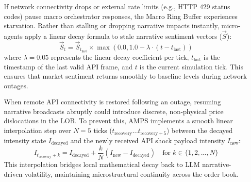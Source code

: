 If network connectivity drops or external rate limits (e.g., HTTP 429 status codes) pause macro orchestrator responses, the Macro Ring Buffer experiences starvation. Rather than stalling or dropping narrative impacts instantly, micro-agents apply a linear decay formula to stale narrative sentiment vectors ($\vec{S}$):
\begin{equation}
    \vec{S}_{t} = \vec{S}_{t_{\text{last}}} \times \max\left(0.0, 1.0 - \lambda \cdot (t - t_{\text{last}})\right)
\end{equation}
where $\lambda = 0.05$ represents the linear decay coefficient per tick, $t_{\text{last}}$ is the timestamp of the last valid API frame, and $t$ is the current simulation tick. This ensures that market sentiment returns smoothly to baseline levels during network outages.

When remote API connectivity is restored following an outage, resuming narrative broadcasts abruptly could introduce discrete, non-physical price dislocations in the LOB. To prevent this, AMPS implements a smooth linear interpolation step over $N = 5$ ticks ($t_{\text{recovery}} \dots t_{\text{recovery}+5}$) between the decayed intensity state $I_{\text{decayed}}$ and the newly received API shock payload intensity $I_{\text{new}}$:
\begin{equation}
    I_{t_{\text{recovery}} + k} = I_{\text{decayed}} + \frac{k}{N} \left( I_{\text{new}} - I_{\text{decayed}} \right) \quad \text{for } k \in \{1, 2, \dots, N\}
\end{equation}
This interpolation bridges local mathematical decay back to LLM narrative-driven volatility, maintaining microstructural continuity across the order book.

